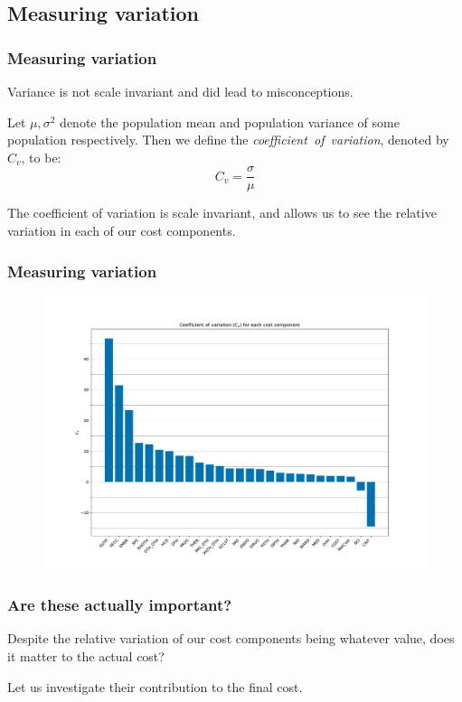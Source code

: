 \documentclass{beamer}
\begin{document}
\subsection{Measuring variation}

\begin{frame}
    \frametitle{Measuring variation}

    Variance is not scale invariant and did lead to misconceptions.

    \pause%
    \vspace{10pt}
    \begin{definition}
        Let \(\mu, \sigma^2\) denote the population mean and population variance
        of some population respectively. Then we define the
        \emph{coefficient~of~variation}, denoted by \(C_v\), to be:
        \[
            C_v = \frac{\sigma}{\mu}
        \]
    \end{definition}

    \pause%
    The coefficient of variation is scale invariant, and allows us to see the
    relative variation in each of our cost components.
\end{frame}

\begin{frame}
    \frametitle{Measuring variation}

    \begin{figure}
        \includegraphics[width=\linewidth]{./img/coeff_variation.pdf}
    \end{figure}
\end{frame}

\begin{frame}
    \frametitle{Are these actually important?}

    Despite the relative variation of our cost components being whatever value,
    does it matter to the actual cost?

    \vspace{10pt}
    Let us investigate their contribution to the final cost.
\end{frame}
\end{document}
